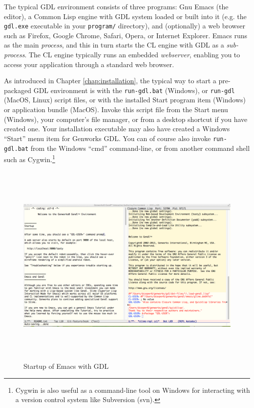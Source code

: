 \documentclass [11pt]{book}
\begin{document}
\label{sec:startup,hello,world!andshutdown}



The typical GDL environment consists of three programs: Gnu
Emacs (the editor), a Common Lisp engine with GDL system loaded or built into it (e.g. the \texttt{gdl.exe} executable in your \texttt{program/} directory), and (optionally) a web browser
such as Firefox, Google Chrome, Safari, Opera, or Internet
Explorer. Emacs runs as the main \emph{process}, and this in turn starts the CL engine with GDL as a \emph{sub-process}. The CL engine typically runs an embedded \emph{webserver}, enabling you to access your application through a standard web browser.



As introduced in Chapter 
\ref{chap:installation}, the typical way to start a pre-packaged GDL environment is with the \texttt{run-gdl.bat} (Windows), or \texttt{run-gdl} (MacOS, Linux) script files, or with the installed Start
program item (Windows) or application bundle (MacOS). Invoke this
script file from the Start menu (Windows), your computer's file
manager, or from a desktop shortcut if you have created one.  Your
installation executable may also have created a Windows ``Start'' menu
item for Genworks GDL. You can of course also invoke \texttt{run-gdl.bat} from the Windows ``cmd'' command-line, or from another command shell such as Cygwin.\footnote{Cygwin is also useful as a command-line tool on Windows
for interacting with a version control system like Subversion (svn).}


\begin{figure}
\begin{center}
\includegraphics[width=6in,height=4in]{../images/emacs-startup.png}
\end{center}

\caption{Startup of Emacs with GDL}

\label{fig:emacs-startup}

\end{figure}
\end{document}
